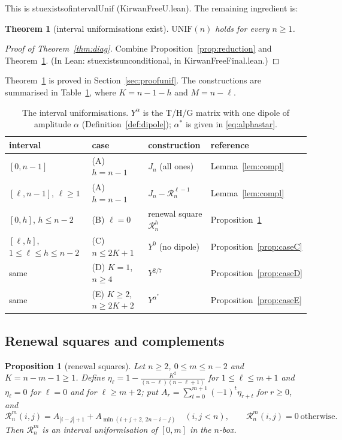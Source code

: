 \documentclass[11pt]{amsart}
\newtheorem{mainthm}{Theorem}
\newtheorem{proposition}[lemma]{Proposition}
\theoremstyle{definition}
\theoremstyle{remark}
\numberwithin{equation}{section}
\newcommand{\cR}{\mathcal{R}}
\newcommand{\leanus}{\textunderscore\allowbreak}
\newcommand{\lean}[1]{{\ttfamily\let\_\leanus #1}}
\begin{document}
This is \lean{stu\_exists\_of\_intervalUnif} (\lean{KirwanFreeU.lean}). The remaining ingredient is:

\begin{mainthm}[interval uniformisations exist]\label{thm:unif}
$\mathrm{UNIF}(n)$ holds for every $n\ge1$.
\end{mainthm}

\begin{proof}[Proof of Theorem~\ref{thm:diag}]
Combine Proposition~\ref{prop:reduction} and Theorem~\ref{thm:unif}. (In Lean:
\lean{stu\_exists\_unconditional}, in \lean{KirwanFreeFinal.lean}.)
\end{proof}

Theorem~\ref{thm:unif} is proved in Section~\ref{sec:proofunif}. The constructions are summarised in
Table~\ref{tab:cases}, where $K=n-1-h$ and $M=n-\ell$.

\begin{table}[ht]
\centering
\begin{tabular}{llll}
\toprule
interval & case & construction & reference\\
\midrule
$[0,n-1]$ & (A) $h=n-1$ & $J_n$ (all ones) & Lemma~\ref{lem:compl}\\
$[\ell,n-1]$, $\ell\ge1$ & (A) $h=n-1$ & $J_n-\cR^{\ell-1}_n$ & Lemma~\ref{lem:compl}\\
$[0,h]$, $h\le n-2$ & (B) $\ell=0$ & renewal square $\cR^h_n$ & Proposition~\ref{prop:renewal}\\
$[\ell,h]$, $1\le\ell\le h\le n-2$ & (C) $n\le2K+1$ & $Y^{0}$ (no dipole) & Proposition~\ref{prop:caseC}\\
same & (D) $K=1$, $n\ge4$ & $Y^{2/7}$ & Proposition~\ref{prop:caseD}\\
same & (E) $K\ge2$, $n\ge2K+2$ & $Y^{\alpha^*}$ & Proposition~\ref{prop:caseE}\\
\bottomrule
\end{tabular}
\caption{The interval uniformisations. $Y^\alpha$ is the T/H/G matrix with one dipole of amplitude
$\alpha$ (Definition~\ref{def:dipole}); $\alpha^*$ is given in \eqref{eq:alphastar}.}
\label{tab:cases}
\end{table}

\subsection{Renewal squares and complements}

\begin{proposition}[renewal squares]\label{prop:renewal}
Let $n\ge2$, $0\le m\le n-2$ and $K=n-m-1\ge1$. Define $\eta_\ell=1-\frac{K^2}{(n-\ell)(n-\ell+1)}$ for
$1\le\ell\le m+1$ and $\eta_\ell=0$ for $\ell=0$ and for $\ell\ge m+2$; put
$A_r=\sum_{t=0}^{m+1}(-1)^t\eta_{r+t}$ for $r\ge0$, and
\[
  \cR^m_n(i,j)=A_{|i-j|+1}+A_{\min(i+j+2,\,2n-i-j)}\quad(i,j<n),\qquad \cR^m_n(i,j)=0\ \text{otherwise}.
\]
Then $\cR^m_n$ is an interval uniformisation of $[0,m]$ in the $n$-box.
\end{proposition}
\end{document}
